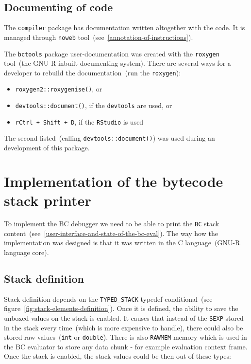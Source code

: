 \documentclass[thesis=M,english]{FITthesis}[2018/10/20]
\newcommand{\code}[1]{\texttt{#1}}
\begin{document}
\subsection{Documenting of code}

The \code{compiler} package has documentation written altogether with the code. It is managed through \code{noweb} tool~(see~\ref{annotation-of-instructions}).

The \code{bctools} package user-documentation was created with the \code{roxygen} tool~(the GNU-R inbuilt documenting system). There are several ways for a developer to rebuild the documentation~(run the \code{roxygen}):
\begin{itemize}
 \item \code{roxygen2::roxygenise()}, or
 \item \code{devtools::document()}, if the \code{devtools} are used, or
 \item \code{rCtrl + Shift + D}, if the \code{RStudio} is used
\end{itemize}

The second listed~(calling \code{devtools::document()}) was used during an development of this package.

\section{Implementation of the bytecode stack printer}\label{implementation-of-stack-printer}

To implement the BC debugger we need to be able to print the \code{BC} stack content~(see~\ref{user-interface-and-state-of-the-bc-eval}). The way how the implementation was designed is that it was written in the C language~(GNU-R language core).

\subsection{Stack definition}\label{stack-definition}

Stack definition depends on the \code{TYPED{\_}STACK} typedef conditional~(see figure~\ref{fig:stack-elements-definition}). Once it is defined, the ability to save the unboxed values on the stack is enabled. It causes that instead of the \code{SEXP} stored in the stack every time~(which is more expensive to handle), there could also be stored raw values~(\code{int} or \code{double}). There is also \code{RAWMEM} memory which is used in the BC evaluator to store any data chunk - for example evaluation context frame. Once the stack is enabled, the stack values could be then out of these types:
\end{document}
